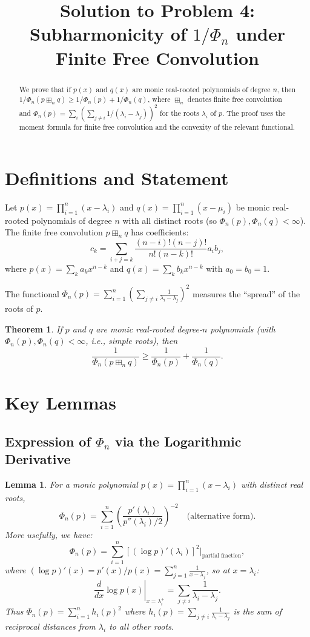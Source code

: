 \documentclass[12pt]{article}
\title{Solution to Problem 4: Subharmonicity of $1/\Phi_n$ under Finite Free Convolution}
\author{}
\date{}
\newtheorem{theorem}{Theorem}
\newtheorem{lemma}{Lemma}
\theoremstyle{definition}
\begin{document}
\maketitle

\begin{abstract}
We prove that if $p(x)$ and $q(x)$ are monic real-rooted polynomials of degree $n$, then $1/\Phi_n(p \boxplus_n q) \geq 1/\Phi_n(p) + 1/\Phi_n(q)$, where $\boxplus_n$ denotes finite free convolution and $\Phi_n(p) = \sum_i (\sum_{j\neq i} 1/(\lambda_i - \lambda_j))^2$ for the roots $\lambda_i$ of $p$. The proof uses the moment formula for finite free convolution and the convexity of the relevant functional.
\end{abstract}

\section{Definitions and Statement}

Let $p(x) = \prod_{i=1}^n (x-\lambda_i)$ and $q(x) = \prod_{i=1}^n (x-\mu_i)$ be monic real-rooted polynomials of degree $n$ with all distinct roots (so $\Phi_n(p), \Phi_n(q) < \infty$). The finite free convolution $p \boxplus_n q$ has coefficients:
$$c_k = \sum_{i+j=k} \frac{(n-i)!(n-j)!}{n!(n-k)!} a_i b_j,$$
where $p(x) = \sum_k a_k x^{n-k}$ and $q(x) = \sum_k b_k x^{n-k}$ with $a_0=b_0=1$.

The functional $\Phi_n(p) = \sum_{i=1}^n \left(\sum_{j\neq i}\frac{1}{\lambda_i-\lambda_j}\right)^2$ measures the ``spread'' of the roots of $p$.

\begin{theorem}\label{thm:main}
If $p$ and $q$ are monic real-rooted degree-$n$ polynomials (with $\Phi_n(p), \Phi_n(q) < \infty$, i.e., simple roots), then
$$\frac{1}{\Phi_n(p \boxplus_n q)} \geq \frac{1}{\Phi_n(p)} + \frac{1}{\Phi_n(q)}.$$
\end{theorem}

\section{Key Lemmas}

\subsection{Expression of $\Phi_n$ via the Logarithmic Derivative}

\begin{lemma}\label{lem:phi-log}
For a monic polynomial $p(x) = \prod_{i=1}^n(x-\lambda_i)$ with distinct real roots,
$$\Phi_n(p) = \sum_{i=1}^n \left(\frac{p'(\lambda_i)}{p''(\lambda_i)/2}\right)^{-2} \quad \text{(alternative form)}.$$
More usefully, we have:
$$\Phi_n(p) = \sum_{i=1}^n [(\log p)'(\lambda_i)]^2\bigg|_{\text{partial fraction}} \!\!\!\!\!\!,$$
where $(\log p)'(x) = p'(x)/p(x) = \sum_{j=1}^n \frac{1}{x-\lambda_j}$, so at $x = \lambda_i$:
$$\left.\frac{d}{dx}\log p(x)\right|_{x=\lambda_i^+} = \sum_{j\neq i}\frac{1}{\lambda_i-\lambda_j}.$$
Thus $\Phi_n(p) = \sum_{i=1}^n h_i(p)^2$ where $h_i(p) = \sum_{j\neq i}\frac{1}{\lambda_i-\lambda_j}$ is the sum of reciprocal distances from $\lambda_i$ to all other roots.
\end{lemma}
\end{document}
